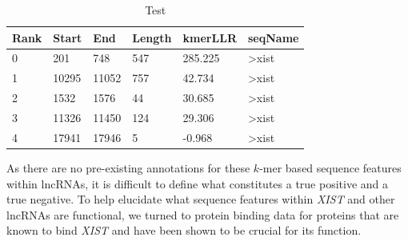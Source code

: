\begin{table}[h]
\centering
\begin{tabular}{|l|l|l|l|l|l|}
\hline 
Rank&Start & End   & Length & kmerLLR & seqName                               \\
\hline 
0     & 201   & 748    & 547     & 285.225  & \textgreater{}xist \\
1     & 10295 & 11052  & 757     & 42.734   & \textgreater{}xist \\
2     & 1532  & 1576   & 44      & 30.685  & \textgreater{}xist \\
3     & 11326 & 11450  & 124     & 29.306   & \textgreater{}xist \\
4     & 17941 & 17946  & 5       & -0.968 & \textgreater{}xist\\
\hline 
\end{tabular}
\caption{Test}
\label{tbl:hmmresults}
\end{table}

As there are no pre-existing annotations for these $k$-mer based sequence features within lncRNAs, it is difficult to define what constitutes a true positive and a true negative. To help elucidate what sequence features within \emph{XIST} and other lncRNAs are functional, we turned to protein binding data for proteins that are known to bind \emph{XIST} and have been shown to be crucial for its function.

